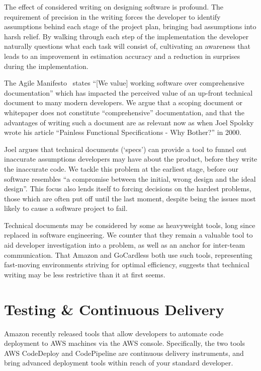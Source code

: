 \documentclass[11pt]{article}
\begin{document}
The effect of considered writing on designing software is profound. The
requirement of precision in the writing forces the developer to identify
assumptions behind each stage of the project plan, bringing bad assumptions into
harsh relief. By walking through each step of the implementation the developer
naturally questions what each task will consist of, cultivating an awareness
that leads to an improvement in estimation accuracy and a reduction in surprises
during the implementation.

The Agile Manifesto~\cite{agileManifesto} states “[We value] working software
over comprehensive documentation” which has impacted the perceived value of an
up-front technical document to many modern developers. We argue that a scoping
document or whitepaper does not constitute “comprehensive” documentation, and
that the advantages of writing such a document are as relevant now as when Joel
Spolsky wrote his article “Painless Functional Specifications - Why Bother?” in
2000.

Joel argues that technical documents (`specs') can provide a tool to funnel out
inaccurate assumptions developers may have about the product, before they write
the inaccurate code. We tackle this problem at the earliest stage, before our
software resembles “a compromise between the initial, wrong design and the ideal
design”. This focus also lends itself to forcing decisions on the hardest
problems, those which are often put off until the last moment, despite being the
issues most likely to cause a software project to fail.

Technical documents may be considered by some as heavyweight tools, long since
replaced in software engineering. We counter that they remain a valuable tool to
aid developer investigation into a problem, as well as an anchor for inter-team
communication. That Amazon and GoCardless both use such tools, representing
fast-moving environments striving for optimal efficiency, suggests that
technical writing may be less restrictive than it at first seems.

\section{Testing & Continuous Delivery}

Amazon recently released tools that allow developers to automate code deployment
to AWS machines via the AWS console. Specifically, the two tools AWS CodeDeploy
and CodePipeline are continuous delivery instruments, and bring advanced
deployment tools within reach of your standard developer.
\end{document}
